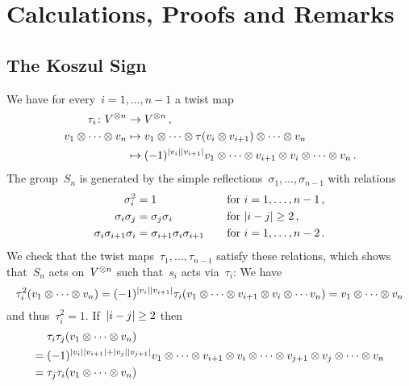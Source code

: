 \section{Calculations, Proofs and Remarks}


\subsection{The Koszul Sign}
\label{koszul sign proof}

We have for every~$i = 1, \dotsc, n-1$ a twist map
\begin{align*}
  \tau_i
  \colon
  V^{\otimes n}
  &\to
  V^{\otimes n} \,,
  \\
  v_1 \otimes \dotsb \otimes v_n
  &\mapsto
  v_1 \otimes \dotsb \otimes \tau(v_i \otimes v_{i+1}) \otimes \dotsb \otimes v_n
  \\
  &\mapsto
  (-1)^{\lvert v_i\rvert \lvert v_{i+1}\rvert}
  v_1 \otimes \dotsb \otimes v_{i+1} \otimes v_i \otimes \dotsb \otimes v_n \,.
\end{align*}
The group~$S_n$ is generated by the simple reflections~$\sigma_1, \dotsc, \sigma_{n-1}$ with relations
\begin{alignat*}{2}
  \sigma_i^2
  &=
  1
  &
  \quad
  &\text{for~$i = 1, \dotsc, n-1$} \,,
  \\
  \sigma_i \sigma_j
  &=
  \sigma_j \sigma_i
  &
  \quad
  &\text{for~$\lvert i-j\rvert \geq 2$} \,,
  \\
  \sigma_i \sigma_{i+1} \sigma_i
  &=
  \sigma_{i+1} \sigma_i \sigma_{i+1}
  &
  \quad
  &\text{for~$i = 1, \dotsc, n-2$} \,.
\end{alignat*}
We check that the twist maps~$\tau_1, \dotsc, \tau_{n-1}$ satisfy these relations, which shows that~$S_n$ acts on~$V^{\otimes n}$ such that~$s_i$ acts via~$\tau_i$:
We have
\[
  \tau_i^2(v_1 \otimes \dotsb \otimes v_n)
  =
  (-1)^{\lvert v_i\rvert \lvert v_{i+1}\rvert}
  \tau_i(v_1 \otimes \dotsb \otimes v_{i+1} \otimes v_i \otimes \dotsb v_n)
  =
  v_1 \otimes \dotsb \otimes v_n
\]
and thus~$\tau_i^2 = 1$.
If~$\lvert i-j\rvert \geq 2$ then
\begin{align*}
  {}&
  \tau_i \tau_j (v_1 \otimes \dotsb \otimes v_n)
  \\
  ={}&
  (-1)^{\lvert v_i\rvert \lvert v_{i+1}\rvert + \lvert v_j\rvert \lvert v_{j+1}\rvert}
          v_1
  \otimes \dotsb
  \otimes v_{i+1} \otimes v_i
  \otimes \dotsb
  \otimes v_{j+1} \otimes v_j
  \otimes \dotsb
  \otimes v_n
  \\
  ={}&
  \tau_j \tau_i (v_1 \otimes \dotsb \otimes v_n)
\end{align*}
